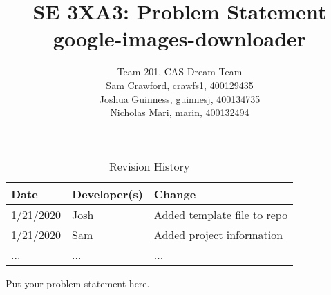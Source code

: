 \documentclass{article}
\title{SE 3XA3: Problem Statement\\google-images-downloader}
\author{Team 201, CAS Dream Team
		\\ Sam Crawford, crawfs1, 400129435
		\\ Joshua Guinness, guinnesj, 400134735
		\\ Nicholas Mari, marin, 400132494
}
\date{}
\begin{document}
\begin{table}[h]
\caption{Revision History} \label{TblRevisionHistory}
\begin{tabularx}{\textwidth}{llX}
\toprule
\textbf{Date} & \textbf{Developer(s)} & \textbf{Change}\\
\midrule
1/21/2020 & Josh & Added template file to repo\\
1/21/2020 & Sam & Added project information\\
... & ... & ...\\
\bottomrule
\end{tabularx}
\end{table}

\newpage

\maketitle

Put your problem statement here.
\end{document}
